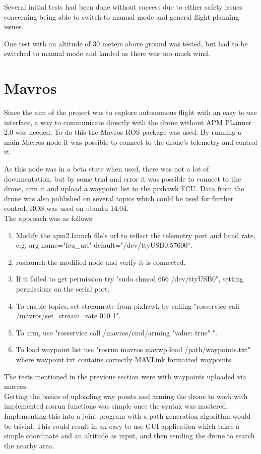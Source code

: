 Several initial tests had been done without success due to either safety issues concerning being
able to switch to manual mode and general flight planning issues.

One test with an altitude of 30 meters above ground was tested, but had to be switched to manual
mode and landed as there was too much wind.
 
\section{Mavros}
\label{sec:mavros}
Since the aim of the project was to explore autonomous flight with an easy to use interface, a way
to communicate directly with the drone without APM PLanner 2.0 was needed. To do this the Mavros
\cite{Ref:Mavros} ROS package was used. By running a main Mavros node it was possible to connect to
the drone's telemetry and control it.

As this node was in a beta state when used, there was not a lot of documentation, but by some trial
and error it was possible to connect to the drone, arm it and upload a waypoint list to the
pixhawk FCU. Data from the drone was also published on several topics which could be used for further
control. ROS was used on ubuntu 14.04.\\
The approach was as follows:
\begin{enumerate}
\item Modify the apm2.launch file's url to reflect the telemetry port and baud rate, e.g. arg
name="fcu\_url" default="/dev/ttyUSB0:57600".
\item roslaunch the modified node and verify it is connected.
\item If it failed to get permission try "sudo chmod 666 /dev/ttyUSB0", setting permissions on the serial port.
\item To enable topics, set streamrate from pixhawk by calling "rosservice call /mavros/set\_stream\_rate
010 1".
\item To arm, use "rosservice call /mavros/cmd/arming "value: true" ".
\item To load waypoint list use "rosrun mavros mavwp load /path/waypoints.txt" where
waypoint.txt contains correctly MAVLink formatted waypoints.
\end{enumerate}

The tests mentioned in the previous section were with waypoints uploaded via mavros.\\%
Getting the basics of uploading way points and arming the drone to work with implemented rosrun
functions was simple once the syntax was mastered.
Implementing this into a joint program with a
path generation algorithm would be trivial.
This could result in an easy to use GUI application
which takes a simple coordinate and an altitude as input,
and then sending the drone to search the nearby area.

